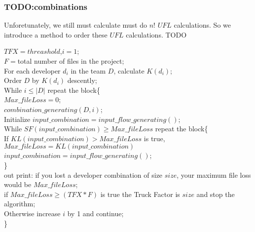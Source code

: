 \subsubsection{TODO:combinations}
Unforetunately, we still must calculate must do $n!$ $UFL$ calculations. So we introduce a method to order these $UFL$ calculations.
TODO
\begin{algorithm}
\SetAlgoLined
{}
\end{algorithm}
\begin{raggedright}
\scriptsize
$TFX = threashold$,$i=1$;\\
$F=$total number of files in the project;\\
For each developer $d_i$ in the team $D$, calculate $K(d_i)$;\\
Order $D$ by $K(d_i)$ descently;\\
While $i\leq |D|$ repeat the block\{\\
$Max\_fileLoss =0$;\\
$combination\_generating(D,i)$;\\
Initialize $input\_combination = input\_flow\_generating()$;\\
While $SF(input\_combination)\geq Max\_fileLoss$ repeat the block\{\\
If $KL(input\_combination) > Max\_fileLoss$ is true, $Max\_fileLoss=KL(input\_combination)$
$input\_combination = input\_flow\_generating()$;\\
\}\\
out print: if you lost a developer combination of size $size$, your maximum file loss would be $Max\_fileLoss$;\\
if $Max\_fileLoss \geq (TFX*F)$ is true the Truck Factor is $size$ and stop the algorithm;\\
Otherwise increase $i$ by 1 and continue;\\
\}\\
\end{raggedright}
